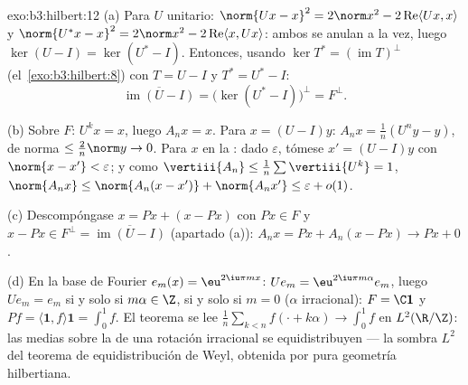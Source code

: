 \begin{solution}{exo:b3:hilbert:12}
(a) Para $U$ unitario: $\norm{Ux - x}^2 = 2\norm x^2 -
2\operatorname{Re}\langle Ux, x\rangle$ y $\norm{U^*x -
x}^2 = 2\norm x^2 - 2\operatorname{Re}\langle x, Ux\rangle$: ambos se
anulan a la vez, luego $\ker(U - I) = \ker(U^* - I)$. Entonces, usando
$\ker T^* = (\operatorname{im}T)^\perp$ (el~\cref{exo:b3:hilbert:8}) con
$T = U - I$ y $T^* = U^* -
I$:
\[
\overline{\operatorname{im}(U - I)} = \bigl(\ker(U^* -
I)\bigr)^\perp = F^\perp .
\]

(b) Sobre $F$: $U^kx = x$, luego $A_nx = x$. Para $x = (U - I)y$:
$A_nx = \frac1n(U^ny - y)$, de norma $\leq \frac2n\norm y \to
0$. Para $x$ en la : dado
$\varepsilon$, tómese $x' =
(U - I)y$ con $\norm{x - x'} < \varepsilon$; y como
$\vertiii{A_n} \leq \frac1n\sum\vertiii{U^k} = 1$,
$\norm{A_nx} \leq \norm{A_n(x - x')} + \norm{A_nx'} \leq
\varepsilon + o(1)$.

(c) Descompóngase $x = Px + (x - Px)$ con $Px \in F$ y $x -
Px \in F^\perp = \overline{\operatorname{im}(U - I)}$ (apartado
(a)): $A_nx = Px + A_n(x - Px) \to Px + 0$.

(d) En la base de Fourier $e_m(x) = \eu^{2\iu\pi mx}$: $Ue_m
= \eu^{2\iu\pi m\alpha}e_m$, luego $Ue_m = e_m$ si y solo si $m\alpha
\in \Z$, si y solo si $m = 0$ ($\alpha$ irracional): $F = \C\mathbf 1$ y
$Pf = \langle\mathbf 1, f\rangle\mathbf 1 = \int_0^1f$. El teorema se
lee $\frac1n\sum_{k<n}f(\cdot + k\alpha) \to
\int_0^1f$ en $L^2(\R/\Z)$: las medias sobre la
 de una rotación irracional se
equidistribuyen --- la sombra $L^2$ del teorema de equidistribución de
Weyl, obtenida por pura geometría hilbertiana.
\end{solution}


